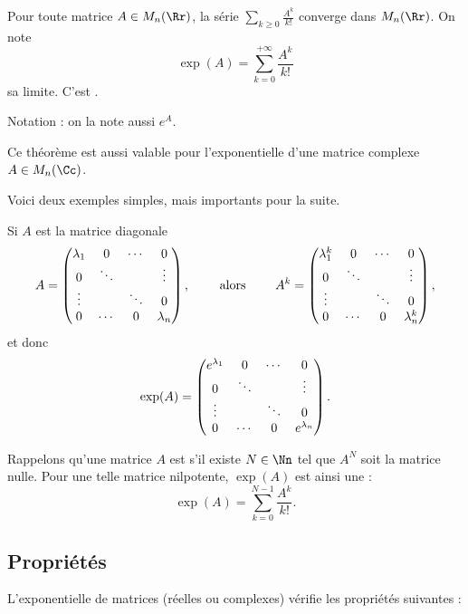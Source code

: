 \documentclass[12pt, class=report,crop=false]{standalone}
\begin{document}
\begin{theoreme}
Pour toute matrice $A \in M_n(\Rr)$, la série $\sum_{k\ge0} \frac{A^k}{k!}$
converge dans $M_n(\Rr)$. On note
\[\exp(A) = \sum_{k=0}^{+\infty} \frac{A^k}{k!}\]
sa limite. C'est .
\end{theoreme}

Notation : on la note aussi $e^A$.

Ce théorème est aussi valable pour l'exponentielle d'une matrice complexe $A \in M_n(\Cc)$.

\bigskip


Voici deux exemples simples, mais importants pour la suite.

\begin{exemple}
Si $A$ est la matrice diagonale
$$A =
\begin{pmatrix}
\lambda_1&0&\cdots &0\cr
0& \ddots & &\vdots \cr
\vdots & &\ddots&0\cr
0&\cdots&0&\lambda_n
\end{pmatrix},
\qquad \text{ alors } \qquad
A^k =
\begin{pmatrix}
\lambda_1^k&0&\cdots &0\cr
0& \ddots & &\vdots \cr
\vdots & &\ddots&0\cr
0&\cdots&0&\lambda_n^k
\end{pmatrix},
$$
et donc 
$$\exp(A) =
\begin{pmatrix}
e^{\lambda_1}&0&\cdots &0\cr
0& \ddots & &\vdots \cr
\vdots & &\ddots&0\cr
0&\cdots&0&e^{\lambda_n}
\end{pmatrix}.$$
\end{exemple}


\begin{exemple}
Rappelons qu'une matrice $A$ est  s'il existe $N \in \Nn$ tel que $A^N$ soit la matrice nulle.
Pour une telle matrice nilpotente, $\exp(A)$ est ainsi une  :
\[\exp(A) = \sum_{k=0}^{N-1} \frac{A^k}{k!}.\]
\end{exemple}



\subsection{Propriétés}

L'exponentielle de matrices (réelles ou complexes) vérifie les propriétés suivantes :
\end{document}
